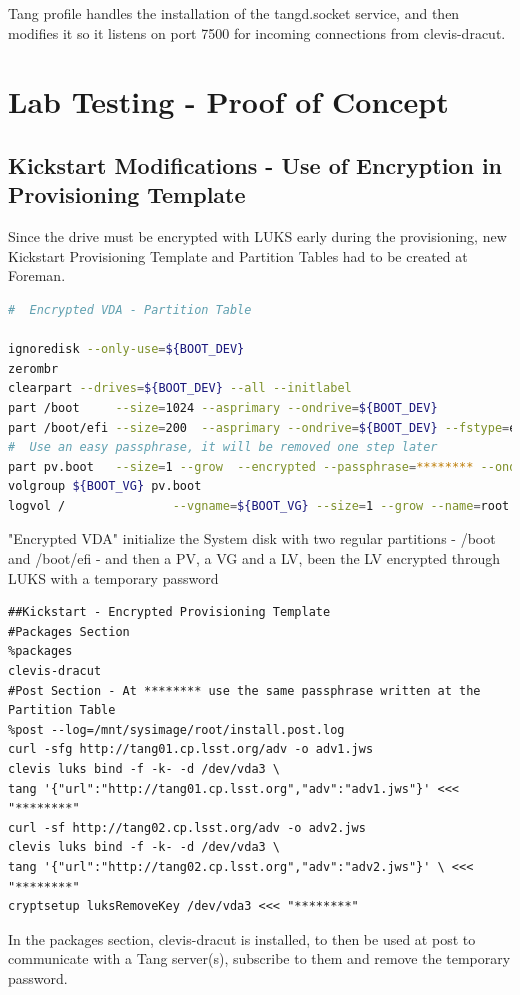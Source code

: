 Tang profile handles the installation of the tangd.socket service, and then modifies it so it listens on port 7500 for incoming connections from clevis-dracut.

\newpage
\section{Lab Testing - Proof of Concept}
\subsection{Kickstart Modifications - Use of Encryption in Provisioning Template}
Since the drive must be encrypted with LUKS early during the provisioning, new Kickstart Provisioning Template and Partition Tables had to be created at Foreman.

\vskip 0.5cm
\begin{lstlisting}[language=bash]
#  Encrypted VDA - Partition Table

ignoredisk --only-use=${BOOT_DEV}
zerombr
clearpart --drives=${BOOT_DEV} --all --initlabel
part /boot     --size=1024 --asprimary --ondrive=${BOOT_DEV}
part /boot/efi --size=200  --asprimary --ondrive=${BOOT_DEV} --fstype=efi
#  Use an easy passphrase, it will be removed one step later
part pv.boot   --size=1 --grow  --encrypted --passphrase=******** --ondisk=${BOOT_DEV}
volgroup ${BOOT_VG} pv.boot
logvol /               --vgname=${BOOT_VG} --size=1 --grow --name=root
\end{lstlisting}

"Encrypted VDA" initialize the System disk with two regular partitions - /boot and /boot/efi - and then a PV, a VG and a LV, been the LV encrypted through LUKS with a temporary password
\begin{lstlisting}
##Kickstart - Encrypted Provisioning Template
#Packages Section
%packages
clevis-dracut
#Post Section - At ******** use the same passphrase written at the Partition Table
%post --log=/mnt/sysimage/root/install.post.log
curl -sfg http://tang01.cp.lsst.org/adv -o adv1.jws
clevis luks bind -f -k- -d /dev/vda3 \
tang '{"url":"http://tang01.cp.lsst.org","adv":"adv1.jws"}' <<< "********"
curl -sf http://tang02.cp.lsst.org/adv -o adv2.jws
clevis luks bind -f -k- -d /dev/vda3 \
tang '{"url":"http://tang02.cp.lsst.org","adv":"adv2.jws"}' \ <<< "********"
cryptsetup luksRemoveKey /dev/vda3 <<< "********"
\end{lstlisting}

In the packages section, clevis-dracut is installed, to then be used at post to communicate with a Tang server(s), subscribe to them and remove the temporary password.

